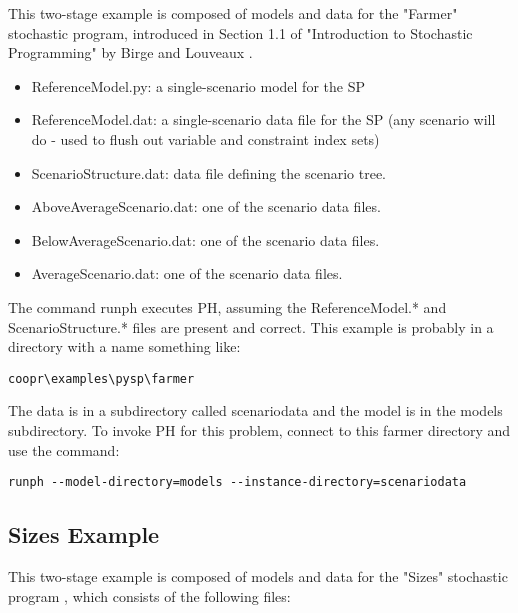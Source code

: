 This two-stage example is composed of models and data for the "Farmer" stochastic program, introduced in Section 1.1 of 
"Introduction to Stochastic Programming" by Birge and 
Louveaux \cite{spbook}. 

\begin{itemize}
\item ReferenceModel.py: a single-scenario model for the SP
\item ReferenceModel.dat: a single-scenario data file for the SP (any scenario will do - used to flush out variable and constraint index sets)
\item ScenarioStructure.dat: data file defining the scenario tree.
\item AboveAverageScenario.dat: one of the scenario data files.
\item BelowAverageScenario.dat: one of the scenario data files.
\item AverageScenario.dat: one of the scenario data files.
\end{itemize}

The command runph executes PH, assuming the ReferenceModel.* and ScenarioStructure.* files are present and correct. 
This example is probably in a directory with a name something like:

\begin{verbatim}
coopr\examples\pysp\farmer
\end{verbatim}

The data is in a subdirectory called scenariodata and the model is in the models subdirectory. To
invoke PH for this problem, connect to this farmer directory and use the command:

\begin{verbatim}
runph --model-directory=models --instance-directory=scenariodata
\end{verbatim}

\subsection{Sizes Example}

This two-stage example is composed of models and data for the "Sizes" stochastic program \cite{sizes,lokwood}, which consists of the following files:

